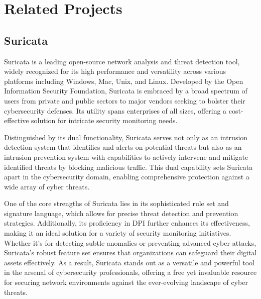\section{Related Projects}
\vspace{-18pt}
\subsection{Suricata}
\vspace{-18pt}
Suricata is a leading open-source network analysis and threat detection tool, widely recognized for its high performance and versatility across various platforms including Windows, Mac, Unix, and Linux. Developed by the Open Information Security Foundation, Suricata is embraced by a broad spectrum of users from private and public sectors to major vendors seeking to bolster their cybersecurity defenses. Its utility spans enterprises of all sizes, offering a cost-effective solution for intricate security monitoring needs.\par 
Distinguished by its dual functionality, Suricata serves not only as an intrusion detection system that identifies and alerts on potential threats but also as an intrusion prevention system with capabilities to actively intervene and mitigate identified threats by blocking malicious traffic. This dual capability sets Suricata apart in the cybersecurity domain, enabling comprehensive protection against a wide array of cyber threats.\par 
One of the core strengths of Suricata lies in its sophisticated rule set and signature language, which allows for precise threat detection and prevention strategies. Additionally, its proficiency in DPI further enhances its effectiveness, making it an ideal solution for a variety of security monitoring initiatives. Whether it's for detecting subtle anomalies or preventing advanced cyber attacks, Suricata's robust feature set ensures that organizations can safeguard their digital assets effectively. As a result, Suricata stands out as a versatile and powerful tool in the arsenal of cybersecurity professionals, offering a free yet invaluable resource for securing network environments against the ever-evolving landscape of cyber threats\cite{Suricata_2024}.
